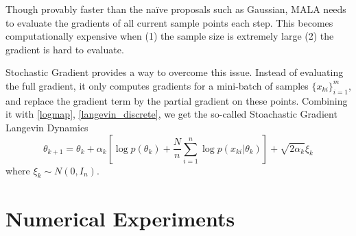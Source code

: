 \documentclass[10pt]{amsart}
\begin{document}
Though provably faster than the na\"ive proposals such as Gaussian, MALA needs to evaluate the gradients of all current sample points each step. This becomes computationally expensive when (1) the sample size is extremely large (2) the gradient is hard to evaluate.

Stochastic Gradient provides a way to overcome this issue. Instead of evaluating the full gradient, it only computes gradients for a mini-batch of samples $\{x_{ki}\}_{i=1}^m$, and replace the gradient term by the partial gradient on these points. Combining it with \eqref{logmap}, \eqref{langevin_discrete}, we get the so-called Stoachastic Gradient Langevin Dynamics 
\begin{equation}\label{SGLD}
    \theta_{k+1}=\theta_k + \alpha_k\left[\log p(\theta_k)+\frac{N}{n}\sum_{i=1}^n \log p(x_{ki}|\theta_k)\right]+\sqrt{2\alpha_k}\xi_k    
\end{equation}
where $\xi_k\sim N(0,I_n)$.

\section{Numerical Experiments}



\end{document}

